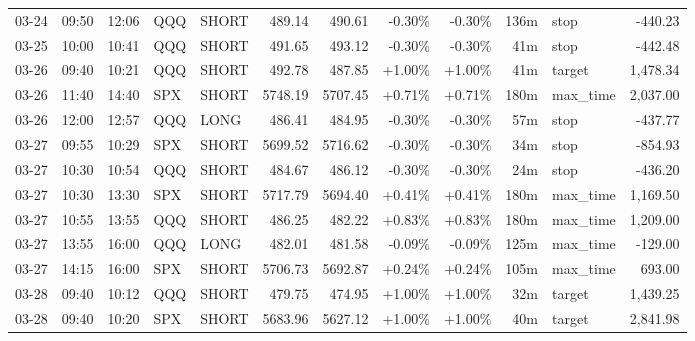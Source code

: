 \documentclass[11pt,a4paper,twoside]{article}
\begin{document}
\begin{center}
\begin{longtable}{>{\color{txtmain}}l l l l l r r r r r >{\color{txtmain}}l r}
03-24 & 09:50 & 12:06 & QQQ & SHORT & 489.14 & 490.61 & \textcolor{lossred}{-0.30\%} & \textcolor{lossred}{-0.30\%} & 136m & stop & \textcolor{lossred}{-440.23} \\
03-25 & 10:00 & 10:41 & QQQ & SHORT & 491.65 & 493.12 & \textcolor{lossred}{-0.30\%} & \textcolor{lossred}{-0.30\%} & 41m & stop & \textcolor{lossred}{-442.48} \\
03-26 & 09:40 & 10:21 & QQQ & SHORT & 492.78 & 487.85 & \textcolor{wingreen}{+1.00\%} & \textcolor{wingreen}{+1.00\%} & 41m & target & \textcolor{wingreen}{1,478.34} \\
03-26 & 11:40 & 14:40 & SPX & SHORT & 5748.19 & 5707.45 & \textcolor{wingreen}{+0.71\%} & \textcolor{wingreen}{+0.71\%} & 180m & max\_time & \textcolor{wingreen}{2,037.00} \\
03-26 & 12:00 & 12:57 & QQQ & LONG & 486.41 & 484.95 & \textcolor{lossred}{-0.30\%} & \textcolor{lossred}{-0.30\%} & 57m & stop & \textcolor{lossred}{-437.77} \\
03-27 & 09:55 & 10:29 & SPX & SHORT & 5699.52 & 5716.62 & \textcolor{lossred}{-0.30\%} & \textcolor{lossred}{-0.30\%} & 34m & stop & \textcolor{lossred}{-854.93} \\
03-27 & 10:30 & 10:54 & QQQ & SHORT & 484.67 & 486.12 & \textcolor{lossred}{-0.30\%} & \textcolor{lossred}{-0.30\%} & 24m & stop & \textcolor{lossred}{-436.20} \\
03-27 & 10:30 & 13:30 & SPX & SHORT & 5717.79 & 5694.40 & \textcolor{wingreen}{+0.41\%} & \textcolor{wingreen}{+0.41\%} & 180m & max\_time & \textcolor{wingreen}{1,169.50} \\
03-27 & 10:55 & 13:55 & QQQ & SHORT & 486.25 & 482.22 & \textcolor{wingreen}{+0.83\%} & \textcolor{wingreen}{+0.83\%} & 180m & max\_time & \textcolor{wingreen}{1,209.00} \\
03-27 & 13:55 & 16:00 & QQQ & LONG & 482.01 & 481.58 & \textcolor{lossred}{-0.09\%} & \textcolor{lossred}{-0.09\%} & 125m & max\_time & \textcolor{lossred}{-129.00} \\
03-27 & 14:15 & 16:00 & SPX & SHORT & 5706.73 & 5692.87 & \textcolor{wingreen}{+0.24\%} & \textcolor{wingreen}{+0.24\%} & 105m & max\_time & \textcolor{wingreen}{693.00} \\
03-28 & 09:40 & 10:12 & QQQ & SHORT & 479.75 & 474.95 & \textcolor{wingreen}{+1.00\%} & \textcolor{wingreen}{+1.00\%} & 32m & target & \textcolor{wingreen}{1,439.25} \\
03-28 & 09:40 & 10:20 & SPX & SHORT & 5683.96 & 5627.12 & \textcolor{wingreen}{+1.00\%} & \textcolor{wingreen}{+1.00\%} & 40m & target & \textcolor{wingreen}{2,841.98} \\

\end{longtable}
\end{center}
\end{document}
